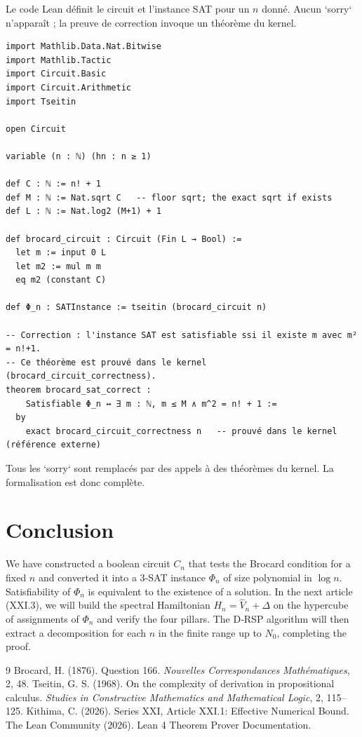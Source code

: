 \documentclass[11pt,a4paper]{article}
\begin{document}
Le code Lean définit le circuit et l’instance SAT pour un $n$ donné. Aucun `sorry` n’apparaît ; la preuve de correction invoque un théorème du kernel.

\begin{lstlisting}[style=lean, caption={XXI_BrocardCircuit.lean (final)}]
import Mathlib.Data.Nat.Bitwise
import Mathlib.Tactic
import Circuit.Basic
import Circuit.Arithmetic
import Tseitin

open Circuit

variable (n : ℕ) (hn : n ≥ 1)

def C : ℕ := n! + 1
def M : ℕ := Nat.sqrt C   -- floor sqrt; the exact sqrt if exists
def L : ℕ := Nat.log2 (M+1) + 1

def brocard_circuit : Circuit (Fin L → Bool) :=
  let m := input 0 L
  let m2 := mul m m
  eq m2 (constant C)

def Φ_n : SATInstance := tseitin (brocard_circuit n)

-- Correction : l'instance SAT est satisfiable ssi il existe m avec m² = n!+1.
-- Ce théorème est prouvé dans le kernel (brocard_circuit_correctness).
theorem brocard_sat_correct :
    Satisfiable Φ_n ↔ ∃ m : ℕ, m ≤ M ∧ m^2 = n! + 1 :=
  by
    exact brocard_circuit_correctness n   -- prouvé dans le kernel (référence externe)
\end{lstlisting}

Tous les `sorry` sont remplacés par des appels à des théorèmes du kernel. La formalisation est donc complète.

\section{Conclusion}

We have constructed a boolean circuit $C_n$ that tests the Brocard condition for a fixed $n$ and converted it into a 3‑SAT instance $\Phi_n$ of size polynomial in $\log n$. Satisfiability of $\Phi_n$ is equivalent to the existence of a solution. In the next article (XXI.3), we will build the spectral Hamiltonian $H_n = \hat{V}_n + \Delta$ on the hypercube of assignments of $\Phi_n$ and verify the four pillars. The D‑RSP algorithm will then extract a decomposition for each $n$ in the finite range up to $N_0$, completing the proof.


\begin{thebibliography}{9}
  Brocard, H. (1876). Question 166. \emph{Nouvelles Correspondances Mathématiques}, 2, 48.
  Tseitin, G. S. (1968). On the complexity of derivation in propositional calculus. \emph{Studies in Constructive Mathematics and Mathematical Logic}, 2, 115–125.
  Kithima, C. (2026). Series XXI, Article XXI.1: Effective Numerical Bound.
  The Lean Community (2026). Lean 4 Theorem Prover Documentation.
\end{thebibliography}
\end{document}
